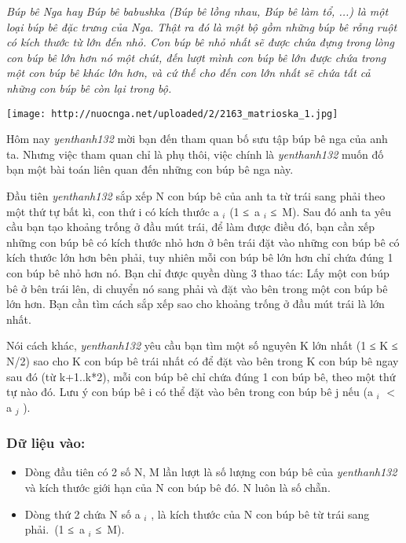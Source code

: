 



\emph{    Búp bê Nga hay Búp bê babushka (Búp bê lồng nhau, Búp bê làm tổ, ...) là một loại búp bê đặc trưng của Nga. Thật ra đó là một bộ gồm những búp bê rỗng ruột có kích thước từ lớn đến nhỏ. Con búp bê nhỏ nhất sẽ được chứa đựng trong lòng con búp bê lớn hơn nó một chút, đến lượt mình con búp bê lớn được chứa trong một con búp bê khác lớn hơn, và cứ thế cho đến con lớn nhất sẽ chứa tất cả những con búp bê còn lại trong bộ.   }


\texttt{[image: http://nuocnga.net/uploaded/2/2163\_matrioska\_1.jpg]}

   Hôm nay   \emph{    yenthanh132   }   mời bạn đến tham quan bố sưu tập búp bê nga của anh ta. Nhưng việc tham quan chỉ là phụ thôi, việc chính là   \emph{    yenthanh132   }   muốn đố bạn một bài toán liên quan đến những con búp bê nga này.  

   Đầu tiên   \emph{    yenthanh132   }   sắp xếp N con búp bê của anh ta từ trái sang phải theo một thứ tự bất kì, con thứ i có kích thước a   $_    i   $   (1 ≤ a   $_    i   $   ≤ M). Sau đó anh ta yêu cầu bạn tạo khoảng trống ở đầu mút trái, để làm được điều đó, bạn cần xếp những con búp bê có kích thước nhỏ hơn ở bên trái đặt vào những con búp bê có kích thước lớn hơn bên phải, tuy nhiên mỗi con búp bê lớn hơn chỉ chứa đúng 1 con búp bê nhỏ hơn nó. Bạn chỉ được quyền dùng 3 thao tác: Lấy một con búp bê ở bên trái lên, di chuyển nó sang phải và       đặt vào bên trong      một con búp bê lớn hơn. Bạn cần tìm cách sắp xếp sao cho khoảng trống ở đầu mút trái là lớn nhất.  

   Nói cách khác,   \emph{    yenthanh132   }   yêu cầu bạn tìm một số nguyên K lớn nhất (1 ≤ K ≤ N/2) sao cho K con búp bê trái nhất có để đặt vào bên trong K con búp bê ngay sau đó (từ k+1..k*2), mỗi con búp bê chỉ chứa đúng 1 con búp bê, theo một thứ tự nào đó. Lưu ý con búp bê i có thể đặt vào bên trong con búp bê j nếu (a   $_    i   $   $<$ a   $_    j   $   ).  

\subsubsection{   Dữ liệu vào:  }
\begin{itemize}
	\item     Dòng đầu tiên có 2 số N, M lần lượt là số lượng con búp bê của    \emph{     yenthanh132    }    và kích thước giới hạn của N con búp bê đó. N luôn là số chẵn.   
	\item     Dòng thứ 2 chứa N số a    $_     i    $    , là kích thước của N con búp bê từ trái sang phải. (1 ≤ a    $_     i    $    ≤ M).   
\end{itemize}

